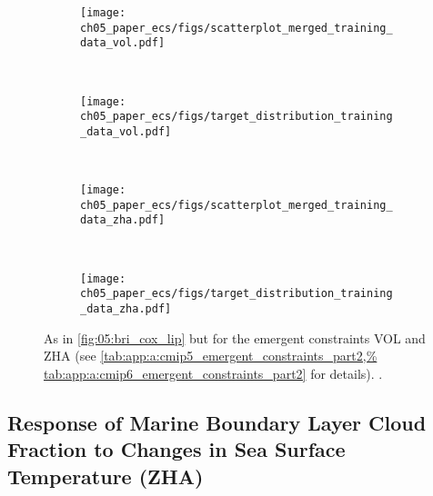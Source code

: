 \begin{figure}[t]
  \centering
  \begin{subfigure}[b]{\SubfigureWidth{}}
    \texttt{[image: 
      ch05\_paper\_ecs/figs/scatterplot\_merged\_training\_data\_vol.pdf]}
    \caption{}
    \label{fig:05:vol_zha:a}
  \end{subfigure}
  ~
  \begin{subfigure}[b]{\SubfigureWidth{}}
    \texttt{[image: 
      ch05\_paper\_ecs/figs/target\_distribution\_training\_data\_vol.pdf]}
    \caption{}
    \label{fig:05:vol_zha:b}
  \end{subfigure}
  \\
  \begin{subfigure}[b]{\SubfigureWidth{}}
    \texttt{[image: 
      ch05\_paper\_ecs/figs/scatterplot\_merged\_training\_data\_zha.pdf]}
    \caption{}
    \label{fig:05:vol_zha:c}
  \end{subfigure}
  ~
  \begin{subfigure}[b]{\SubfigureWidth{}}
    \texttt{[image: 
      ch05\_paper\_ecs/figs/target\_distribution\_training\_data\_zha.pdf]}
    \caption{}
    \label{fig:05:vol_zha:d}
  \end{subfigure}
  \caption[
    As in \cref{fig:05:bri_cox_lip} but for the emergent constraints VOL and
    ZHA.
  ]{
    As in \cref{fig:05:bri_cox_lip} but for the emergent constraints VOL and
    ZHA (see \cref{tab:app:a:cmip5_emergent_constraints_part2,%
      tab:app:a:cmip6_emergent_constraints_part2} for details).
    .
  }
  \label{fig:05:vol_zha}
\end{figure}


\subsection{Response of Marine Boundary Layer Cloud Fraction to Changes in Sea
  Surface Temperature (ZHA)}
\label{subsec:05:zha}

